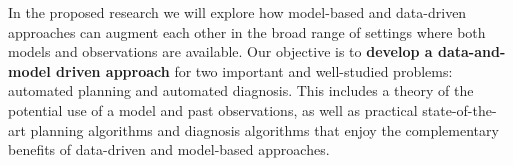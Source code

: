 \documentclass[12pt]{article}
\begin{document}
In the proposed research we will explore how model-based and data-driven approaches can augment each other in the broad range of settings where both models and observations are available. Our objective is to {\bf develop a data-and-model driven approach} for two important and well-studied problems: automated planning and automated diagnosis. This includes a theory of the potential use of a model and past observations, as well as practical state-of-the-art planning algorithms and diagnosis algorithms that enjoy the complementary benefits of data-driven and model-based approaches. 



\end{document}
